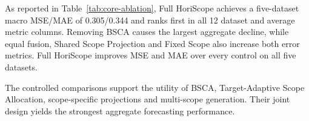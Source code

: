 \documentclass[final,3p,times]{elsarticle}
\begin{document}
\begin{table}[t]
\centering
\caption{Core ablation of HoriScope. Each dataset entry is the mean over prediction horizons $H\in\{96,192,336,720\}$. Lower is better. Best and second-best results are shown in bold and underlined, respectively.}
\label{tab:core-ablation}
\end{table}


As reported in Table~\ref{tab:core-ablation}, Full HoriScope achieves a five-dataset macro MSE/MAE of 0.305/0.344 and ranks first in all 12 dataset and average metric columns. Removing BSCA causes the largest aggregate decline, while equal fusion, Shared Scope Projection and Fixed Scope also increase both error metrics. Full HoriScope improves MSE and MAE over every control on all five datasets.

The controlled comparisons support the utility of BSCA, Target-Adaptive Scope Allocation, scope-specific projections and multi-scope generation. Their joint design yields the strongest aggregate forecasting performance.
\end{document}
